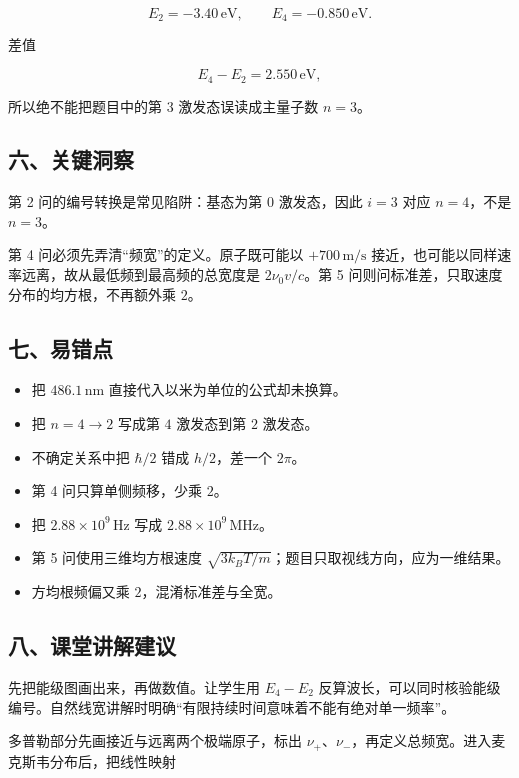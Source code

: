 \documentclass[12pt,a4paper,UTF8]{ctexart}
\newcommand{\tightlist}{\setlength{\itemsep}{0pt}\setlength{\parskip}{0pt}}
\begin{document}
\[E_2=-3.40\,\mathrm{eV},\qquad E_4=-0.850\,\mathrm{eV}.\]

差值

\[E_4-E_2=2.550\,\mathrm{eV},\]

所以绝不能把题目中的第 \(3\) 激发态误读成主量子数 \(n=3\)。

\subsection{六、关键洞察}\label{ux516dux5173ux952eux6d1eux5bdf-6}

第 2 问的编号转换是常见陷阱：基态为第 \(0\) 激发态，因此 \(i=3\) 对应
\(n=4\)，不是 \(n=3\)。

第 4 问必须先弄清``频宽''的定义。原子既可能以 \(+700\,\mathrm{m/s}\)
接近，也可能以同样速率远离，故从最低频到最高频的总宽度是
\(2\nu_0v/c\)。第 5 问则问标准差，只取速度分布的均方根，不再额外乘
\(2\)。

\subsection{七、易错点}\label{ux4e03ux6613ux9519ux70b9-6}

\begin{itemize}
\tightlist
\item
  把 \(486.1\,\mathrm{nm}\) 直接代入以米为单位的公式却未换算。
\item
  把 \(n=4\to2\) 写成第 \(4\) 激发态到第 \(2\) 激发态。
\item
  不确定关系中把 \(\hbar/2\) 错成 \(h/2\)，差一个 \(2\pi\)。
\item
  第 4 问只算单侧频移，少乘 \(2\)。
\item
  把 \(2.88\times10^9\,\mathrm{Hz}\) 写成
  \(2.88\times10^9\,\mathrm{MHz}\)。
\item
  第 5 问使用三维均方根速度
  \(\sqrt{3k_BT/m}\)；题目只取视线方向，应为一维结果。
\item
  方均根频偏又乘 \(2\)，混淆标准差与全宽。
\end{itemize}

\subsection{八、课堂讲解建议}\label{ux516bux8bfeux5802ux8bb2ux89e3ux5efaux8bae-6}

先把能级图画出来，再做数值。让学生用 \(E_4-E_2\)
反算波长，可以同时核验能级编号。自然线宽讲解时明确``有限持续时间意味着不能有绝对单一频率''。

多普勒部分先画接近与远离两个极端原子，标出
\(\nu_+\)、\(\nu_-\)，再定义总频宽。进入麦克斯韦分布后，把线性映射
\end{document}

